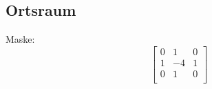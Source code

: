 \documentclass[12pt]{article}
\begin{document}
\subsection{Ortsraum}
Maske: 
\begin{equation*}
\begin{bmatrix}
0 & 1 & 0  \\
1 & -4 & 1\\
0 & 1 & 0\\
\end{bmatrix}
\end{equation*}
\begin{figure}[ht]\centering
\end{figure}
\newpage
\end{document}
